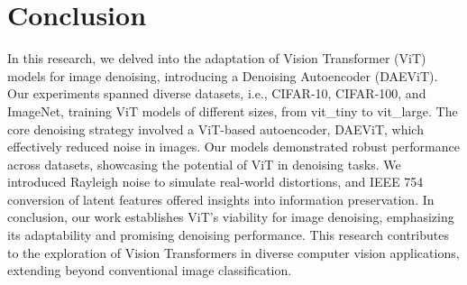 \documentclass[10pt,twocolumn]{IEEEtran}
\begin{document}
\section{Conclusion}
In this research, we delved into the adaptation of Vision Transformer (ViT) models for image denoising, introducing a Denoising Autoencoder (DAEViT). Our experiments spanned diverse datasets, i.e., CIFAR-10, CIFAR-100, and ImageNet, training ViT models of different sizes, from vit\_tiny to vit\_large. The core denoising strategy involved a ViT-based autoencoder, DAEViT, which effectively reduced noise in images. Our models demonstrated robust performance across datasets, showcasing the potential of ViT in denoising tasks. We introduced Rayleigh noise to simulate real-world distortions, and IEEE 754 conversion of latent features offered insights into information preservation. In conclusion, our work establishes ViT's viability for image denoising, emphasizing its adaptability and promising denoising performance. This research contributes to the exploration of Vision Transformers in diverse computer vision applications, extending beyond conventional image classification.



\end{document}
